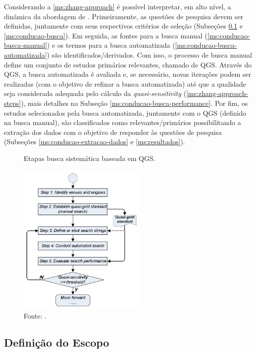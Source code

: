 Considerando a \autoref{ms:zhang-approach} é possível interpretar, em alto nível, a dinâmica da abordagem de . Primeiramente, as questões de pesquisa devem ser definidas, juntamente com seus respectivos critérios de seleção (Subseções \ref{ms:conducao-escopo} e \ref{ms:conducao-busca}). Em seguida, as fontes para a busca manual (\autoref{ms:conducao-busca-manual}) e os termos para a busca automatizada (\autoref{ms:conducao-busca-automatizada}) são identificados/derivados. Com isso, o processo de busca manual define um conjunto de estudos primários relevantes, chamado de QGS. Através do QGS, a busca automatizada é avaliada e, se necessário, novas iterações podem ser realizadas (com o objetivo de refinar a busca automatizada) até que a qualidade seja considerada adequada pelo cálculo da \textit{quasi-sensitivity} (\autoref{ms:zhang-approach-steps}), mais detalhes na Subseção \ref{ms:conducao-busca-performance}. Por fim, os estudos selecionados pela busca automatizada, juntamente com o QGS (definido na busca manual), são classificados como relevantes/primários possibilitando a extração dos dados com o objetivo de responder às questões de pesquisa (Subseções \ref{ms:conducao-extracao-dados} e \ref{ms:resultados}).

\begin{figure}[htbp]
\caption{Etapas busca sistemática baseada em QGS.}
\label{ms:zhang-approach-steps}
\centerline{\includegraphics[width=0.55\textwidth]{images/zhang-systematic-mapping-steps.png}}
\caption*{Fonte: .}
\end{figure}

\subsection{Definição do Escopo}
\label{ms:conducao-escopo}


